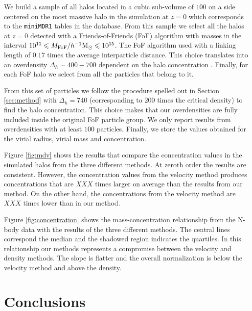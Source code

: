\documentclass[useAMS,usenatbib]{mn2e}
\newcommand{\hMpc}{{\ifmmode{h^{-1}{\rm Mpc}}\else{$h^{-1}$Mpc }\fi}}
\newcommand{\hMsun}{{\ifmmode{h^{-1}{\rm
        {M_{\odot}}}}\else{$h^{-1}{\rm{M_{\odot}}}$~}\fi}}
\begin{document}
We build a sample of all halos located in a cubic sub-volume of $100$
\hMpc on a side centered on the most massive halo in the simulation at
$z=0$ which corresponds to the \texttt{miniMDR1} tables in the
database.
From this sample we select all the halos at $z=0$ detected with a
Friends-of-Friends (FoF) algorithm with masses in the interval
$10^{11}\leq M_{\rm FoF}/\hMsun \leq 10^{15}$.
The FoF algorithm used with a linking length of $0.17$ times the average
interparticle distance. This choice translates into an overdensity
$\Delta_h\sim 400-700$ dependent on the halo concentration
\citep{More2011}.
Finally, for each FoF halo we select from all the particles that
belong to it.

From this set of particles we follow the procedure spelled out in
Section \ref{sec:method} with $\Delta_h=740$  (corresponding to $200$
times the critical density) to find the halo concentration.
This choice makes that our overdensities are fully included inside the
original FoF particle group.
We only report results from overdensities with at least $100$ particles.
Finally, we store the values obtained for the virial radius, virial
mass and concentration.


Figure \ref{fig:mdv} shows the results that compare the concentration
values in the simulated halos from the three different methods.
At zeroth order the results are consistent.
However, the concentration values from the velocity method produces
concentrations that are $XXX$ times larger on average than the results
from our method.
On the other hand, the concentrations from the velocity method are
$XXX$ times lower than in our method.



Figure \ref{fig:concentration} shows the mass-concentration
relationship from the N-body data with the results of the three
different methods.
The central lines correspond the median and the
shadowed region indicates the quartiles.
In this relationship our methods represents a compromise between the
velocity and density methods.
The slope is flatter and the overall normalization is below the
velocity method and above the density.


\section{Conclusions}
\label{sec:conclusions}




\end{document}
